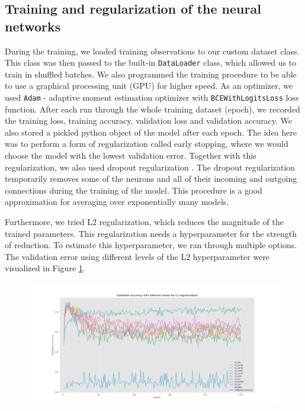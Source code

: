 \subsection{Training and regularization of the neural networks}
During the training, we loaded training observations to our custom dataset class.
This class was then passed to the built-in \verb'DataLoader' class, which allowed us to train in shuffled batches.
We also programmed the training procedure to be able to use a graphical processing unit (GPU) for higher speed.
As an optimizer, we used \verb'Adam' - adaptive moment estimation optimizer \cite{kingma2014adam} with \verb'BCEWithLogitsLoss' loss function. 
After each run through the whole training dataset (epoch), we recorded the training loss, training accuracy, validation loss and validation accuracy.
We also stored a pickled python object of the model after each epoch.
The idea here was to perform a form of regularization called early stopping, where we would choose the model with the lowest validation error.
Together with this regularization, we also used dropout regularization \cite{srivastava2014dropout}.
The dropout regularization temporarily removes some of the neurons and all of their incoming and outgoing connections during the training of the model. 
This procedure is a good approximation for averaging over exponentially many models.

Furthermore, we tried L2 regularization, which reduces the magnitude of the trained parameters. 
This regularization needs a hyperparameter for the strength of reduction. 
To estimate this hyperparameter, we ran through multiple options.
The validation error using different levels of the L2 hyperparameter were visualized in Figure \ref{fig:L2_reg}.

\begin{figure}
    \centering
    \includegraphics[width=\linewidth]{images/val_acc_l2.png}
    \caption{}
    \label{fig:L2_reg}
\end{figure}